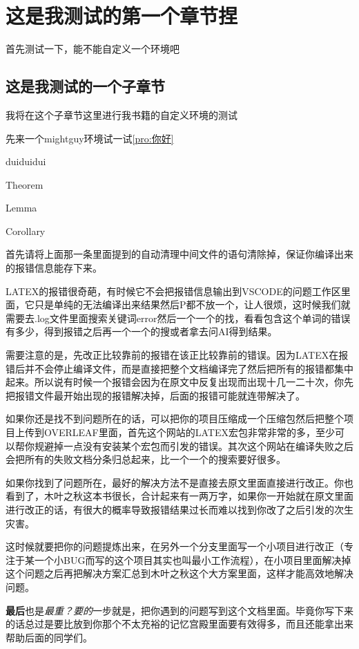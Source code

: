 \documentclass[lang=cn,10pt]{elegantbook}
\begin{document}
\tableofcontents

\chapter{这是我测试的第一个章节捏}
首先测试一下，能不能自定义一个环境吧~

\section{这是我测试的一个子章节}

我将在这个子章节这里进行我书籍的自定义环境的测试

先来一个mightguy环境试一试\ref{pro:你好}

\begin{proposition}\label{pro:你好}
    duiduidui
\end{proposition}

\begin{theorem}
    Theorem
\end{theorem}

\begin{lemma}
    Lemma
\end{lemma}

\begin{corollary}
    Corollary
\end{corollary}
\begin{mightguy}
    首先请将上面那一条里面提到的自动清理中间文件的语句清除掉，保证你编译出来的报错信息能存下来。

    LATEX的报错很奇葩，有时候它不会把报错信息输出到VSCODE的问题工作区里面，它只是单纯的无法编译出来结果然后P都不放一个，让人很烦，这时候我们就需要去.log文件里面搜索关键词error然后一个一个的找，看看包含这个单词的错误有多少，得到报错之后再一个一个的搜或者拿去问AI得到结果。

    需要注意的是，先改正比较靠前的报错在该正比较靠前的错误。因为LATEX在报错后并不会停止编译文件，而是直接把整个文档编译完了然后把所有的报错都集中起来。所以说有时候一个报错会因为在原文中反复出现而出现十几一二十次，你先把报错文件最开始出现的报错解决掉，后面的报错可能就连带解决了。

    如果你还是找不到问题所在的话，可以把你的项目压缩成一个压缩包然后把整个项目上传到OVERLEAF里面，首先这个网站的LATEX宏包非常非常的多，至少可以帮你规避掉一点没有安装某个宏包而引发的错误。其次这个网站在编译失败之后会把所有的失败文档分条归总起来，比一个一个的搜索要好很多。

    如果你找到了问题所在，最好的解决方法不是直接去原文里面直接进行改正。你也看到了，木叶之秋这本书很长，合计起来有一两万字，如果你一开始就在原文里面进行改正的话，有很大的概率导致报错结果过长而难以找到你改了之后引发的次生灾害。

    这时候就要把你的问题提炼出来，在另外一个分支里面写一个小项目进行改正（专注于某一个小BUG而写的这个项目其实也叫最小工作流程），在小项目里面解决掉这个问题之后再把解决方案汇总到木叶之秋这个大方案里面，这样才能高效地解决问题。

    \textbf{最后}也是\textit{最重？要的}一步就是，把你遇到的问题写到这个文档里面。毕竟你写下来的话总过是要比放到你那个不太充裕的记忆宫殿里面要有效得多，而且还能拿出来帮助后面的同学们。
\end{mightguy}
\end{document}
